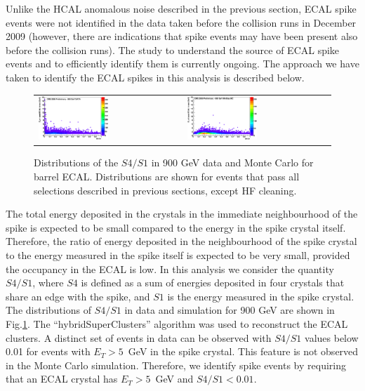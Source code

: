 Unlike the HCAL anomalous noise described in the previous section, ECAL
spike events were not identified in the data taken before the collision runs
in December 2009 (however, there are indications that spike events may
have been present also before the collision runs). The study to understand the
source of ECAL spike events and to efficiently identify them is
currently ongoing. The approach we have taken to identify the ECAL
spikes in this analysis is described below.

\begin{figure}[h]
 \centering
 \begin{tabular}{ll}
\includegraphics[width=0.5\textwidth]{plots_ecalnoise/ECalSeedET_Vs_S4_DATA900GeV.eps}&
\includegraphics[width=0.5\textwidth]{plots_ecalnoise/ECalSeedET_Vs_S4_MC900GeV.eps}\\
 \end{tabular}
\caption{Distributions of the $S4/S1$ in 900 GeV data and Monte Carlo
  for barrel ECAL. Distributions are shown for events that pass all
  selections described in previous sections, except HF cleaning.}
\label{fig:ecal_noise_1}
\end{figure}

The total energy deposited in the crystals in the immediate
neighbourhood of the spike is expected to be small compared to the
energy in the spike crystal itself. Therefore, the ratio of energy
deposited in the neighbourhood of the spike crystal to the energy
measured in the spike itself is expected to be very small, provided the
occupancy in the ECAL is low. In this analysis we consider the quantity
$S4/S1$, where $S4$ is defined as a sum of energies deposited in four
crystals that share an edge with the spike, and $S1$ is the energy
measured in the spike crystal. The distributions of $S4/S1$ in data and
simulation for 900 GeV are shown in Fig.\ref{fig:ecal_noise_1}. The
``hybridSuperClusters'' algorithm was used to reconstruct the ECAL
clusters. A distinct set of events in data can be observed with $S4/S1$
values below 0.01 for events with $E_T>5$~GeV in the spike
crystal. This feature is not observed in the Monte Carlo
simulation. Therefore, we identify spike events by requiring that an
ECAL crystal has $E_T>5$~GeV and $S4/S1<0.01$.

